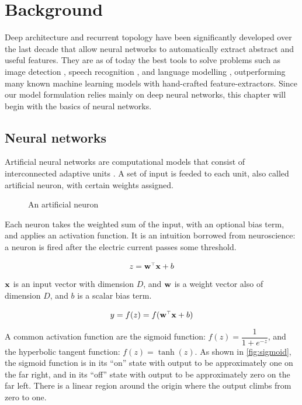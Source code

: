 \chapter{Background}
\label{background}
Deep architecture and recurrent topology have been significantly developed over the last decade that allow neural networks to automatically extract abstract and useful features. They are as of today the best tools to solve problems such as image detection \cite{krizhevsky12, girshick14}, speech recognition \cite{dahl12, deng13}, and language modelling \cite{mnih07, mikolov10}, outperforming many known machine learning models with hand-crafted feature-extractors. Since our model formulation relies mainly on deep neural networks, this chapter will begin with the basics of neural networks. 

\section{Neural networks}
Artificial neural networks are computational models that consist of interconnected adaptive units \cite{hassoun03}. A set of input is feeded to each unit, also called artificial neuron, with certain weights assigned. 

\begin{figure}
\centering

\caption{An artificial neuron}
\label{fig:neuron}
\end{figure}

Each neuron takes the weighted sum of the input, with an optional bias term, and applies an activation function. It is an intuition borrowed from neuroscience: a neuron is fired after the electric current passes some threshold.

\begin{equation}
z = \mathbf{w}^{\mathstrut\scriptscriptstyle\top}\mathbf{x} + b
\end{equation}

$\mathbf{x}$ is an input vector with dimension $D$, and $\mathbf{w}$ is a weight vector also of dimension $D$, and $b$ is a scalar bias term.

\begin{equation}
y = f(z)=f(\mathbf{w}^{\mathstrut\scriptscriptstyle\top}\mathbf{x} + b)
\end{equation}

A common activation function are the sigmoid function: $f(z) = \dfrac{1}{1+e^{-z}}$, and the hyperbolic tangent function: $f(z) = \tanh(z)$. As shown in \ref{fig:sigmoid}, the sigmoid function is in its ``on'' state with output to be approximately one on the far right, and in its ``off'' state with output to be approximately zero on the far left. There is a linear region around the origin where the output climbs from zero to one. 

